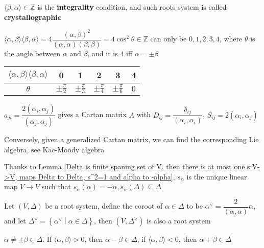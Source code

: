 \documentclass[main]{subfiles}
\begin{document}
\begin{remark}
$\langle\beta,\alpha\rangle\in\mathbb Z$ is the \textbf{integrality} condition, and such roots system is called \textbf{crystallographic} \par
$\langle\alpha,\beta\rangle\langle\beta,\alpha\rangle=4\dfrac{(\alpha,\beta)^2}{(\alpha,\alpha)(\beta,\beta)}=4\cos^2\theta\in\mathbb Z$ can only be $0,1,2,3,4$, where $\theta$ is the angle between $\alpha$ and $\beta$, and it is $4$ iff $\alpha=\pm\beta$
\begin{center}
\begin{tabular}{|c|c|c|c|c|c|}
\hline
$\langle\alpha,\beta\rangle\langle\beta,\alpha\rangle$ & 0 &1&2&3&4 \\
\hline
$\theta$&$\pm\frac{\pi}{2}$&$\pm\frac{\pi}{3}$&$\pm\frac{\pi}{4}$&$\pm\frac{\pi}{6}$&$0$ \\
\hline
\end{tabular}
\end{center}
$a_{ji}=\dfrac{2(\alpha_i,\alpha_j)}{(\alpha_j,\alpha_j)}$ gives a Cartan matrix $A$ with $D_{ij}=\dfrac{\delta_{ij}}{(\alpha_i,\alpha_i)}$, $S_{ij}=2(\alpha_i,\alpha_j)$ \par
Conversely, given a generalized Cartan matrix, we can find the corresponding Lie algebra, see Kac-Moody algebra
\end{remark}

\begin{remark}
Thanks to Lemma \ref{Delta is finite spaning set of V, then there is at most one s:V->V, maps Delta to Delta, s^2=1 and alpha to -alpha}, $s_\alpha$ is the unique linear map $V\to V$ such that $s_\alpha(\alpha)=-\alpha,s_\alpha(\Delta)\subseteq\Delta$
\end{remark}

\begin{definition}
Let $(V,\Delta)$ be a root system, define the coroot of $\alpha\in\Delta$ to be $\alpha^\vee=\dfrac{2}{(\alpha,\alpha)}\alpha$, and let $\Delta^\vee=\left\{\alpha^\vee\middle|\alpha\in\Delta\right\}$, then $(V,\Delta^\vee)$ is also a root system
\end{definition}

\begin{lemma}\label{alpha not equal to pm beta are roots, (alpha,beta)>0 => alpha-beta is a root}
$\alpha\neq\pm\beta\in\Delta$. If $\langle\alpha,\beta\rangle>0$, then $\alpha-\beta\in\Delta$, if $\langle\alpha,\beta\rangle<0$, then $\alpha+\beta\in\Delta$
\end{lemma}
\end{document}
